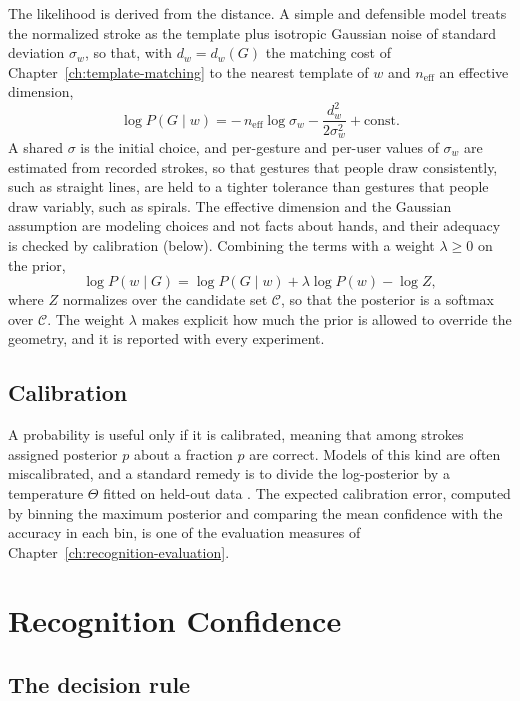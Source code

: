 The likelihood is derived from the distance. A simple and defensible model treats the normalized stroke as the template plus isotropic Gaussian noise of standard deviation $\sigma_w$, so that, with $d_w=d_w(G)$ the matching cost of Chapter~\ref{ch:template-matching} to the nearest template of $w$ and $n_{\mathrm{eff}}$ an effective dimension,
\[
\log P(G\mid w)= -\,n_{\mathrm{eff}}\log\sigma_w-\frac{d_w^{2}}{2\sigma_w^{2}}+\text{const}.
\]
A shared $\sigma$ is the initial choice, and per-gesture and per-user values of $\sigma_w$ are estimated from recorded strokes, so that gestures that people draw consistently, such as straight lines, are held to a tighter tolerance than gestures that people draw variably, such as spirals. The effective dimension and the Gaussian assumption are modeling choices and not facts about hands, and their adequacy is checked by calibration (below). Combining the terms with a weight $\lambda\ge0$ on the prior,
\[
\log P(w\mid G)=\log P(G\mid w)+\lambda\log P(w)-\log Z,
\]
where $Z$ normalizes over the candidate set $\mathcal C$, so that the posterior is a softmax over $\mathcal C$. The weight $\lambda$ makes explicit how much the prior is allowed to override the geometry, and it is reported with every experiment.

\section{Calibration}

A probability is useful only if it is calibrated, meaning that among strokes assigned posterior $p$ about a fraction $p$ are correct. Models of this kind are often miscalibrated, and a standard remedy is to divide the log-posterior by a temperature $\Theta$ fitted on held-out data \cite{guo2017}.\evD{} The expected calibration error, computed by binning the maximum posterior and comparing the mean confidence with the accuracy in each bin, is one of the evaluation measures of Chapter~\ref{ch:recognition-evaluation}.

\chapter{Recognition Confidence}\label{ch:confidence}

\section{The decision rule}

